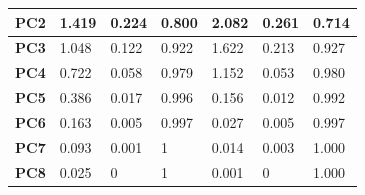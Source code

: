 \documentclass[12pt,a4paper]{article}
\begin{document}
\begin{enumerate}[label=\roman*)]
\begin{table}[h]
\begin{tabular}{|l|l|l|l|l|l|l|}
	\textbf{PC2}       & 1.419            & 0.224                                                                      & 0.800                                                                     & 2.082            & {\color[HTML]{FE0000} 0.261}                                               & 0.714                                                                    \\ \hline
	\textbf{PC3}       & 1.048            & 0.122                                                                      & 0.922                                                                     & 1.622            & {\color[HTML]{FE0000} 0.213}                                               & {\color[HTML]{FE0000} 0.927}                                              \\ \hline
	\textbf{PC4}       & 0.722            & 0.058                                                                      & 0.979                                                                     & 1.152            &  0.053                                              &  0.980                                             \\ \hline
	\textbf{PC5}       & 0.386            & 0.017                                                                      & 0.996                                                                     & 0.156            & 0.012                                                                      & 0.992                                                                    \\ \hline
	\textbf{PC6}       & 0.163            & 0.005                                                                      & 0.997                                                                    & 0.027            & 0.005                                                                     & 0.997                                                                     \\ \hline
	\textbf{PC7}       & 0.093            & 0.001                                                                      & 1                                                                         & 0.014            & 0.003                                                                      & 1.000                                                                     \\ \hline
	\textbf{PC8}       & 0.025            & 0                                                                          & 1                                                                         & 0.001            & 0                                                                          & 1.000                                                                     \\ \hline

\end{tabular}
\end{table}
\end{enumerate}
\end{document}
